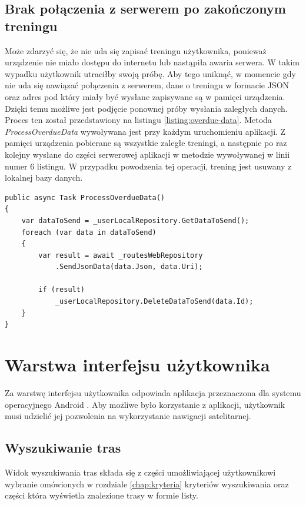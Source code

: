 \subsection{Brak połączenia z serwerem po zakończonym treningu}
Może zdarzyć się, że nie uda się zapisać treningu użytkownika, ponieważ urządzenie nie miało dostępu do internetu lub nastąpiła awaria serwera. W takim wypadku użytkownik utraciłby swoją próbę. Aby tego uniknąć, w momencie gdy nie uda się nawiązać połączenia z serwerem, dane o treningu w formacie JSON oraz adres pod który miały być wysłane zapisywane są w pamięci urządzenia. Dzięki temu możliwe jest podjęcie ponownej próby wysłania zaległych danych. Proces ten został przedstawiony na listingu \ref{listing:overdue-data}. Metoda \textit{ProcessOverdueData} wywoływana jest przy każdym uruchomieniu aplikacji. Z pamięci urządzenia pobierane są wszystkie zaległe treningi, a następnie po raz kolejny wysłane do części serwerowej aplikacji w metodzie wywoływanej w linii numer 6 listingu. W przypadku powodzenia tej operacji, trening jest usuwany z lokalnej bazy danych.
\begin{lstlisting}[caption={Obsługa zaległych danych},label=listing:overdue-data]
public async Task ProcessOverdueData()
{
    var dataToSend = _userLocalRepository.GetDataToSend();
    foreach (var data in dataToSend)
    {
        var result = await _routesWebRepository
        	.SendJsonData(data.Json, data.Uri);

        if (result)
            _userLocalRepository.DeleteDataToSend(data.Id);
    }
}
\end{lstlisting}

\section{Warstwa interfejsu użytkownika}
Za warstwę interfejsu użytkownika odpowiada aplikacja przeznaczona dla systemu operacyjnego Android \cite{android}. Aby możliwe było korzystanie z aplikacji, użytkownik musi udzielić jej pozwolenia na wykorzystanie nawigacji satelitarnej. 
\subsection{Wyszukiwanie tras}
Widok wyszukiwania tras składa się z części umożliwiającej użytkownikowi wybranie omówionych w rozdziale \ref{chap:kryteria} kryteriów wyszukiwania oraz części która wyświetla znalezione trasy w formie listy.


